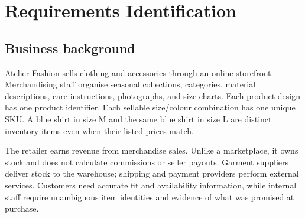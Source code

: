 \chapter{Requirements Identification}
\section{Business background}
Atelier Fashion sells clothing and accessories through an online storefront. Merchandising staff organise seasonal collections, categories, material descriptions, care instructions, photographs, and size charts. Each product design has one product identifier. Each sellable size/colour combination has one unique SKU. A blue shirt in size M and the same blue shirt in size L are distinct inventory items even when their listed prices match.

The retailer earns revenue from merchandise sales. Unlike a marketplace, it owns stock and does not calculate commissions or seller payouts. Garment suppliers deliver stock to the warehouse; shipping and payment providers perform external services. Customers need accurate fit and availability information, while internal staff require unambiguous item identities and evidence of what was promised at purchase.

